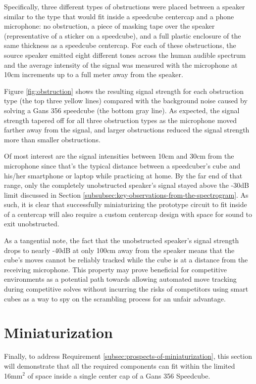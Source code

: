 Specifically, three different types of obstructions were placed between
a speaker similar to the type that would fit inside a speedcube
centercap and a phone microphone: no obstruction, a piece of masking
tape over the speaker (representative of a sticker on a speedcube), and
a full plastic enclosure of the same thickness as a speedcube
centercap. For each of these obstructions, the source speaker emitted
eight different tones across the human audible spectrum and the average
intensity of the signal was measured with the microphone at 10cm
increments up to a full meter away from the speaker.

Figure \ref{fig:obstruction} shows the resulting signal strength for
each obstruction type (the top three yellow lines) compared with the
background noise caused by solving a Gans 356 speedcube (the bottom
gray line). As expected, the signal strength tapered off for all three
obstruction types as the microphone moved farther away from the signal,
and larger obstructions reduced the signal strength more than smaller
obstructions.

Of most interest are the signal intensities between 10cm and 30cm from
the microphone since that's the typical distance between a speedcuber's
cube and his/her smartphone or laptop while practicing at home. By the
far end of that range, only the completely unobstructed speaker's
signal stayed above the -30dB limit discussed in Section
\ref{subsubsec:key-observations-from-the-spectrogram}. As such, it is
clear that successfully miniaturizing the prototype circuit to fit
inside of a centercap will also require a custom centercap design with
space for sound to exit unobstructed.

As a tangential note, the fact that the unobstructed speaker's signal
strength drops to nearly -40dB at only 100cm away from the speaker
means that the cube's moves cannot be reliably tracked while the cube
is at a distance from the receiving microphone. This property may prove
beneficial for competitive environments as a potential path towards
allowing automated move tracking during competitive solves without
incurring the risks of competitors using smart cubes as a way to spy on
the scrambling process for an unfair advantage.


\section{Miniaturization}
\label{sec:miniaturization}

Finally, to address Requirement
\ref{subsec:prospects-of-miniaturization}, this section will
demonstrate that all the required components can fit within the limited
16mm$^2$ of space inside a single center cap of a Gans 356 Speedcube.

